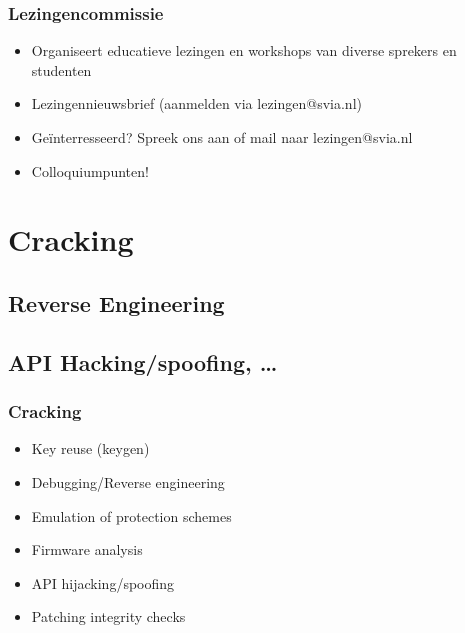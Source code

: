 \documentclass{beamer}
\begin{document}
\begin{frame}
	\frametitle{Lezingencommissie}

	\begin{itemize}
		\item Organiseert educatieve lezingen en workshops van diverse sprekers en studenten
		\item Lezingennieuwsbrief (aanmelden via lezingen@svia.nl)
		\item Ge\"interresseerd? Spreek ons aan of mail naar lezingen@svia.nl
		\item Colloquiumpunten!
	\end{itemize}
\end{frame}

\section{Cracking}
\subsection{Reverse Engineering}
\subsection{API Hacking/spoofing, \dots}

\begin{frame}
	\frametitle{Cracking}

	\begin{itemize}
		\item Key reuse (keygen)
		\item Debugging/Reverse engineering
		\item Emulation of protection schemes
		\item Firmware analysis
		\item API hijacking/spoofing
		\item Patching integrity checks
	\end{itemize}
\end{frame}
\end{document}

